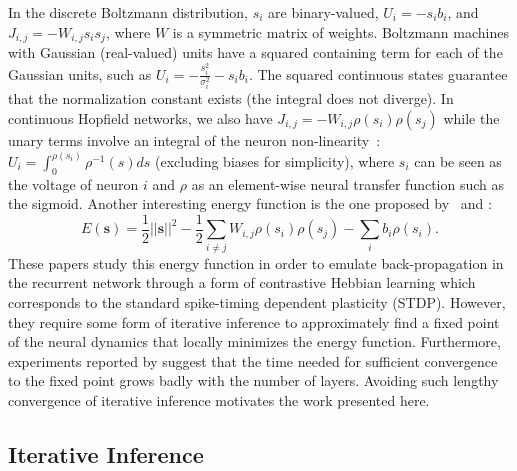 \documentclass{article}
\newcommand   \vs{{\bm s}}
\begin{document}
In the discrete Boltzmann distribution, $s_i$ are binary-valued, $U_i = -s_i b_i$,
and $J_{i,j} = - W_{i,j} s_i s_j$, where $W$ is a symmetric matrix of weights.
Boltzmann machines with Gaussian (real-valued) units have a squared containing term for
each of the Gaussian units, such as $U_i = -\frac{s_i^2}{\sigma_i^2} - s_i b_i$.
The squared continuous states guarantee that the normalization constant exists (the integral does not diverge).
In continuous Hopfield networks, we also have $J_{i,j}=- W_{i,j} \rho(s_i) \rho(s_j)$ while
the unary terms involve an integral of the neuron non-linearity~\citep{Hopfield84}:
$U_i = \int_0^{\rho(s_i)} \rho^{-1}(s) ds$ (excluding biases for simplicity), where $s_i$ can be seen as the
voltage of neuron $i$ and $\rho$ as an element-wise neural transfer function
such as the sigmoid. Another interesting energy function is the one proposed
by~\citet{Bengio-arxiv2015} and \citet{Scellier+Bengio-arxiv2016}:
\begin{equation}
  \label{eq:s+b-energy}
  E(\vs) = \frac{1}{2}||\vs||^2 - \frac{1}{2}\sum_{i\neq j} W_{i,j} \rho(s_i) \rho(s_j) - \sum_i b_i \rho(s_i).
\end{equation}
These papers study this energy function in order to emulate back-propagation
in the recurrent network through a form of contrastive Hebbian learning which
corresponds to the standard spike-timing dependent plasticity (STDP).
However, they require some form of iterative inference
to approximately find a fixed point of
the neural dynamics that locally minimizes the energy function.
Furthermore, experiments reported by \citet{Scellier+Bengio-arxiv2016} suggest that the time needed for sufficient
convergence to the fixed point grows badly with the number of layers. Avoiding
such lengthy convergence of iterative inference motivates the work presented here.

\subsection{Iterative Inference}
\end{document}
